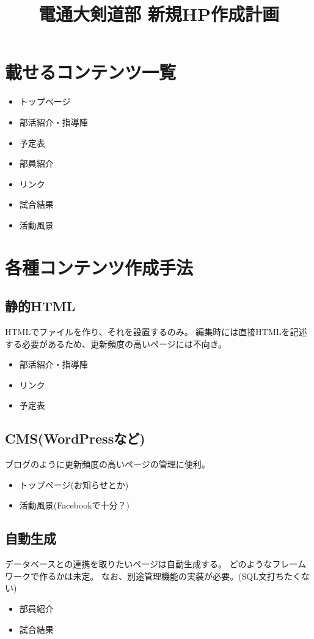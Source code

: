 \documentclass[10pt]{jsarticle}
\title{電通大剣道部 新規HP作成計画}
\begin{document}
\maketitle


\section{載せるコンテンツ一覧}
\begin{itemize}
	\item トップページ
	\item 部活紹介・指導陣
	\item 予定表
	\item 部員紹介
	\item リンク
	\item 試合結果
	\item 活動風景
\end{itemize}


\section{各種コンテンツ作成手法}

\subsection{静的HTML}
HTMLでファイルを作り、それを設置するのみ。
編集時には直接HTMLを記述する必要があるため、更新頻度の高いページには不向き。
\begin{itemize}
	\item 部活紹介・指導陣 
	\item リンク
	\item 予定表
\end{itemize}

\subsection{CMS(WordPressなど)}
ブログのように更新頻度の高いページの管理に便利。
\begin{itemize}
	\item トップページ(お知らせとか)
	\item 活動風景(Facebookで十分？)
\end{itemize}

\subsection{自動生成}
データベースとの連携を取りたいページは自動生成する。
どのようなフレームワークで作るかは未定。
なお、別途管理機能の実装が必要。(SQL文打ちたくない)
\begin{itemize}
	\item 部員紹介
	\item 試合結果
\end{itemize}
\end{document}
